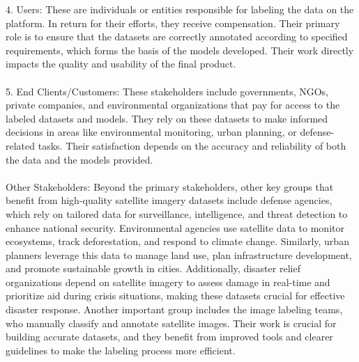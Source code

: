 \documentclass{article}
\begin{document}
4.	Users: These are individuals or entities responsible for labeling the data on the platform. In return for their efforts, they receive compensation. Their primary role is to ensure that the datasets are correctly annotated according to specified requirements, which forms the basis of the models developed. Their work directly impacts the quality and usability of the final product. \\
\\

5.	End Clients/Customers: These stakeholders include governments, NGOs, private companies, and environmental organizations that pay for access to the labeled datasets and models. They rely on these datasets to make informed decisions in areas like environmental monitoring, urban planning, or defense-related tasks. Their satisfaction depends on the accuracy and reliability of both the data and the models provided. \\
\\


Other Stakeholders: Beyond the primary stakeholders, other key groups that benefit from high-quality satellite imagery datasets include defense agencies, which rely on tailored data for surveillance, intelligence, and threat detection to enhance national security. Environmental agencies use satellite data to monitor ecosystems, track deforestation, and respond to climate change. Similarly, urban planners leverage this data to manage land use, plan infrastructure development, and promote sustainable growth in cities. Additionally, disaster relief organizations depend on satellite imagery to assess damage in real-time and prioritize aid during crisis situations, making these datasets crucial for effective disaster response. Another important group includes the image labeling teams, who manually classify and annotate satellite images. Their work is crucial for building accurate datasets, and they benefit from improved tools and clearer guidelines to make the labeling process more efficient.
\end{document}
